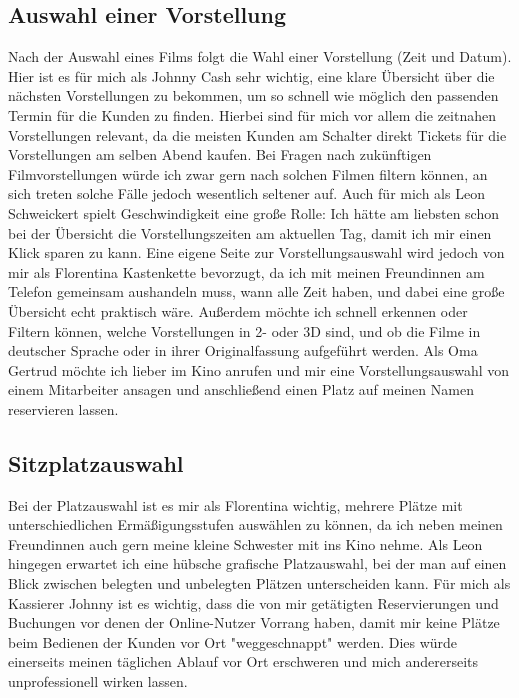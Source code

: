 \subsection{Auswahl einer Vorstellung}
Nach der Auswahl eines Films folgt die Wahl einer Vorstellung (Zeit und Datum). Hier ist es für mich als Johnny Cash sehr wichtig, eine klare Übersicht über die nächsten Vorstellungen zu bekommen, um so schnell wie möglich den passenden Termin für die Kunden zu finden. Hierbei sind für mich vor allem die zeitnahen Vorstellungen relevant, da die meisten Kunden am Schalter direkt Tickets für die Vorstellungen am selben Abend kaufen. Bei Fragen nach zukünftigen Filmvorstellungen würde ich zwar gern nach solchen Filmen filtern können, an sich treten solche Fälle jedoch wesentlich seltener auf. Auch für mich als Leon Schweickert spielt Geschwindigkeit eine große Rolle: Ich hätte am liebsten schon bei der Übersicht die Vorstellungszeiten am aktuellen Tag, damit ich mir einen Klick sparen zu kann. Eine eigene Seite zur Vorstellungsauswahl wird jedoch von  mir als Florentina Kastenkette bevorzugt, da ich mit meinen Freundinnen am Telefon gemeinsam aushandeln muss, wann alle Zeit haben, und dabei eine große Übersicht echt praktisch wäre. Außerdem möchte ich schnell erkennen oder Filtern können, welche Vorstellungen in 2- oder 3D sind, und ob die Filme in deutscher Sprache oder in ihrer Originalfassung aufgeführt werden. Als Oma Gertrud möchte ich lieber im Kino anrufen und mir eine Vorstellungsauswahl von einem Mitarbeiter ansagen und anschließend einen Platz auf meinen Namen reservieren lassen.

\subsection{Sitzplatzauswahl}
Bei der Platzauswahl ist es mir als Florentina wichtig, mehrere Plätze mit unterschiedlichen Ermäßigungsstufen auswählen zu können, da ich neben meinen Freundinnen auch gern meine kleine Schwester mit ins Kino nehme. Als Leon hingegen erwartet ich eine hübsche grafische Platzauswahl, bei der man auf einen Blick zwischen belegten und unbelegten Plätzen unterscheiden kann. Für mich als Kassierer Johnny ist es wichtig, dass die von mir getätigten Reservierungen und Buchungen vor denen der Online-Nutzer Vorrang haben, damit mir keine Plätze beim Bedienen der Kunden vor Ort "weggeschnappt" werden. Dies würde einerseits meinen täglichen Ablauf vor Ort erschweren und mich andererseits unprofessionell wirken lassen.

